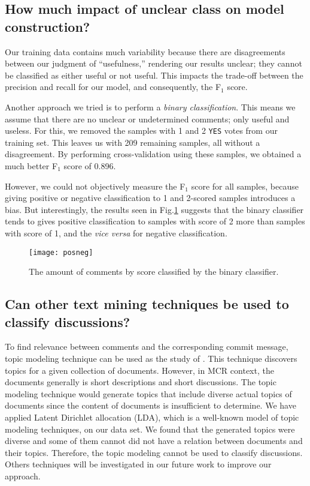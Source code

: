 \subsection{How much impact of unclear class on model construction?}
Our training data contains much variability because there are disagreements between our judgment of ``usefulness,'' rendering our results unclear; they cannot be classified as either useful or not useful.
This impacts the trade-off between the precision and recall for our model, and consequently, the F$_1$ score.

Another approach we tried is to perform a \emph{binary classification}.
This means we assume that there are no unclear or undetermined comments; only useful and useless.
For this, we removed the samples with 1 and 2 \texttt{YES} votes from our training set.
This leaves us with 209 remaining samples, all without a disagreement.
By performing cross-validation using these samples, we obtained a much better F$_1$ score of 0.896.

However, we could not objectively measure the F$_1$ score for all samples, because giving positive or negative classification to 1 and 2-scored samples introduces a bias.
But interestingly, the results seen in Fig.\ref{fig:binary} suggests that the binary classifier tends to gives positive classification to samples with score of 2 more than samples with score of 1, and the \emph{vice versa} for negative classification. 

\begin{figure}[h]
\centering
\texttt{[image: posneg]}
\caption{The amount of comments by score classified by the binary classifier.}
\label{fig:binary}
\end{figure}
\subsection*{Can other text mining techniques be used to classify discussions?}
To find relevance between comments and the corresponding commit message, topic modeling technique can be used as the study of \cite{Barua2012a}. This technique discovers topics for a given collection of documents. However, in MCR context, the documents generally is short descriptions and short discussions. 
The topic modeling technique would generate topics that include diverse actual topics of documents since the content of documents is insufficient to determine. We have applied Latent Dirichlet allocation (LDA), which is a well-known model of topic modeling techniques, on our data set. We found that the generated topics were diverse and some of them cannot did not have a relation between documents and their topics. Therefore, the topic modeling cannot be used to classify discussions. Others techniques will be investigated in our future work to improve our approach.

